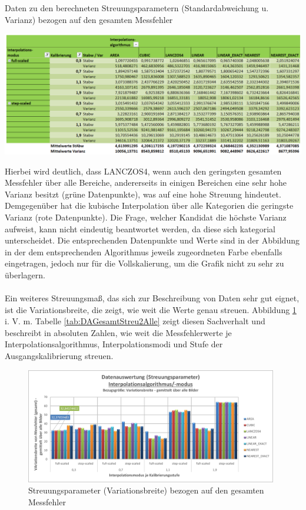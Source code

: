 \documentclass[
fontsize=10pt, 
listof = totoc,
parskip = half	
]{report}
\begin{document}
\begin{table}[H]
	\centering
	\caption{Daten zu den berechneten Streuungsparametern (Standardabweichung u. Varianz) bezogen auf den gesamten Messfehler}
	\label{tab:DAGesamtStreu1Alle}
	\includegraphics[width=\textwidth,height=\textheight,keepaspectratio]{pics/Tab_DA_Gesamt_Streu1_Alle}
\end{table}

\noindent Hierbei wird deutlich, dass LANCZOS4, wenn auch den geringsten gesamten Messfehler über alle Bereiche, andererseits in einigen Bereichen eine sehr hohe Varianz besitzt (grüne Datenpunkte), was auf eine hohe Streuung hindeutet. Demgegenüber hat die kubische Interpolation über alle Kategorien die geringste Varianz (rote Datenpunkte). Die Frage, welcher Kandidat die höchste Varianz aufweist, kann nicht eindeutig beantwortet werden, da diese sich kategorial unterscheidet. Die entsprechenden Datenpunkte und Werte sind in der Abbildung in der dem entsprechenden Algorithmus jeweils zugeordneten Farbe ebenfalls eingetragen, jedoch nur für die Vollskalierung, um die Grafik nicht zu sehr zu überlagern. 
\\\\
Ein weiteres Streuungsmaß, das sich zur Beschreibung von Daten sehr gut eignet, ist die Variationsbreite, die zeigt, wie weit die Werte genau streuen. Abbildung \ref{fig:DAGesamtStreu2Alle} i. V. m. Tabelle \ref{tab:DAGesamtStreu2Alle} zeigt diesen Sachverhalt und beschreibt in absoluten Zahlen, wie weit die Messfehlerwerte je Interpolationsalgorithmus, Interpolationsmodi und Stufe der Ausgangskalibrierung streuen. 

\begin{figure}[H]
	\centering
	\includegraphics[width=11cm, height=\textheight, keepaspectratio]{pics/DA_Gesamt_Streu2_Alle}
	\caption{Streuungsparameter (Variationsbreite) bezogen auf den gesamten Messfehler}
	\label{fig:DAGesamtStreu2Alle}
\end{figure}
\end{document}
